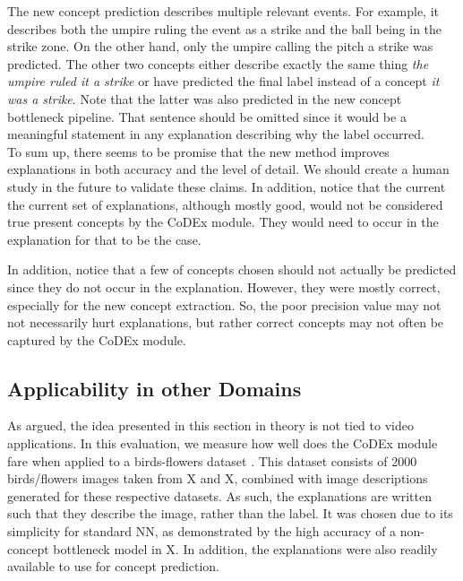 The new concept prediction describes multiple relevant events. 
For example, it describes both the umpire ruling the event as a strike and the ball being in the strike zone.
On the other hand, only the umpire calling the pitch a strike was predicted. 
The other two concepts either describe exactly the same thing \emph{the umpire ruled it a strike} or have predicted the final label instead of a concept \emph{it was a strike}.
Note that the latter was also predicted in the new concept bottleneck pipeline. 
That sentence should be omitted since it would be a meaningful statement in any explanation describing why the label occurred. \\

To sum up, there seems to be promise that the new method improves explanations in both accuracy and the level of detail.
We should create a human study in the future to validate these claims.
In addition, notice that the current the current set of explanations, although mostly good, would not be considered true present concepts by the CoDEx module.
They would need to occur in the explanation for that to be the case.

In addition, notice that a few of concepts chosen should not actually be predicted since they do not occur in the explanation.
However, they were mostly correct, especially for the new concept extraction.
So, the poor precision value may not not necessarily hurt explanations, but rather correct concepts may not often be captured by the CoDEx module.

\subsection{Applicability in other Domains}
\label{applicability-in-other-domains}


As argued, the idea presented in this section in theory is not tied to video applications.
In this evaluation, we measure how well does the CoDEx module fare when applied to a birds-flowers dataset \cite{RefWorks:RefID:87-wah2011caltech-ucsd}.
This dataset consists of 2000 birds/flowers images taken from X and X, combined with image descriptions generated for these respective datasets.
As such, the explanations are written such that they describe the image, rather than the label.
It was chosen due to its simplicity for standard NN, as demonstrated by the high accuracy of a non-concept bottleneck model in X.
In addition, the explanations were also readily available to use for concept prediction.

